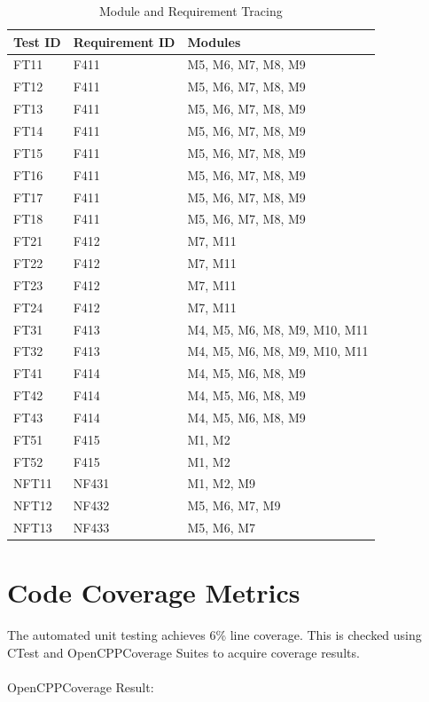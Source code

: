 \documentclass[12pt, titlepage]{article}
\begin{document}
\begin{table}[H]

  \centering
  \caption{Module and Requirement Tracing}
  \begin{tabular}{|l|l|l|}
  \hline
  \textbf{Test ID} & \textbf{Requirement ID} & \textbf{Modules}\\
  \hline
  FT11 & F411 & M5, M6, M7, M8, M9\\
  \hline
  FT12 & F411 & M5, M6, M7, M8, M9\\
  \hline
  FT13 & F411 & M5, M6, M7, M8, M9\\
  \hline
  FT14 & F411 & M5, M6, M7, M8, M9\\
  \hline
  FT15 & F411 & M5, M6, M7, M8, M9\\
  \hline
  FT16 & F411 & M5, M6, M7, M8, M9\\
  \hline
  FT17 & F411 & M5, M6, M7, M8, M9\\
  \hline
  FT18 & F411 & M5, M6, M7, M8, M9\\
  \hline
  FT21 & F412 & M7, M11\\
  \hline
  FT22 & F412 & M7, M11\\
  \hline
  FT23& F412 & M7, M11\\
  \hline
  FT24 & F412 & M7, M11\\
  \hline
  FT31 & F413 & M4, M5, M6, M8, M9, M10, M11\\
  \hline
  FT32 & F413 & M4, M5, M6, M8, M9, M10, M11\\
  \hline
  FT41 & F414 & M4, M5, M6, M8, M9\\
  \hline
  FT42 & F414 & M4, M5, M6, M8, M9\\
  \hline
  FT43 & F414 & M4, M5, M6, M8, M9\\
  \hline
  FT51 & F415 & M1, M2\\
  \hline
  FT52 & F415 & M1, M2\\
  \hline
  NFT11 & NF431 & M1, M2, M9\\
  \hline
  NFT12 & NF432 & M5, M6, M7, M9\\
  \hline
  NFT13 & NF433 & M5, M6, M7\\
  \hline
  \end{tabular}
\end{table}

\section{Code Coverage Metrics}

The automated unit testing achieves 6\% line coverage. This is checked using CTest and OpenCPPCoverage Suites to acquire coverage results.\\
\\
OpenCPPCoverage Result:
\end{document}

